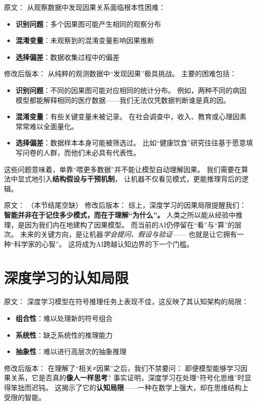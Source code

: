 原文：
从观察数据中发现因果关系面临根本性困难：
\begin{itemize}
\item \textbf{识别问题}：多个因果图可能产生相同的观察分布
\item \textbf{混淆变量}：未观察到的混淆变量影响因果推断
\item \textbf{选择偏差}：数据收集过程中的偏差
\end{itemize}
修改后版本：
从纯粹的观测数据中“发现因果”极具挑战。  
主要的困难包括：  
\begin{itemize}
\item \textbf{识别问题}：不同的因果图可能对应相同的统计分布。  
  例如，两种不同的病因模型都能解释相同的医疗数据——我们无法仅凭数据判断谁是真的因。  
\item \textbf{混淆变量}：有些关键变量未被记录。  
  在社会调查中，收入、教育或心理因素常常难以全面量化。  
\item \textbf{选择偏差}：数据样本本身可能被筛选过。  
  比如“健康饮食”研究往往基于愿意填写问卷的人群，而他们未必具有代表性。  
\end{itemize}
这些问题意味着，单靠“喂更多数据”并不能让模型自动理解因果。  
我们需要在算法中显式地引入\textbf{结构假设与干预机制}，  
让机器不仅看见模式，更能推理背后的逻辑。



原文：
（本节结尾空缺）
修改后版本：
综上，深度学习的因果局限提醒我们：  
\textbf{智能并非在于记住多少模式，而在于理解“为什么”。}  
人类之所以能从经验中推理，是因为我们内在地建构了因果模型。  
而当前的AI仍停留在“看”与“算”的层次。  
未来的关键方向，是让机器\textit{学会提问、假设与验证}——  
也就是让它拥有一种“科学家的心智”。  
这将成为AI跨越认知边界的下一个门槛。

\section{深度学习的认知局限}

原文：
深度学习模型在符号推理任务上表现不佳，这反映了其认知架构的局限：
\begin{itemize}
\item \textbf{组合性}：难以处理新的符号组合
\item \textbf{系统性}：缺乏系统性的推理能力
\item \textbf{抽象性}：难以进行高层次的抽象推理
\end{itemize}
修改后版本：
在理解了“相关≠因果”之后，我们不禁要问：  
即便模型能够学习因果关系，它是否真的\textbf{像人一样思考}?  
事实证明，深度学习在处理“符号化思维”时显得笨拙而迟钝。  
这揭示了它的\textbf{认知局限}——一种在数学上强大，却在思维结构上受限的智能。

